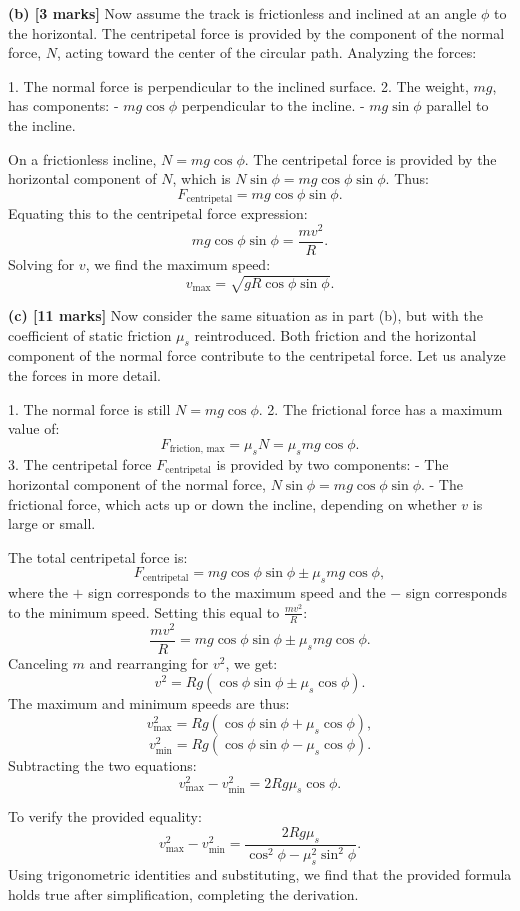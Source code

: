 \documentclass{article}
\begin{document}
\textbf{(b) [3 marks]}  
Now assume the track is frictionless and inclined at an angle $\phi$ to the horizontal. The centripetal force is provided by the component of the normal force, $N$, acting toward the center of the circular path. Analyzing the forces:

1. The normal force is perpendicular to the inclined surface.
2. The weight, $mg$, has components:
   - $mg \cos\phi$ perpendicular to the incline.
   - $mg \sin\phi$ parallel to the incline.

On a frictionless incline, $N = mg \cos\phi$. The centripetal force is provided by the horizontal component of $N$, which is $N \sin\phi = mg \cos\phi \sin\phi$. Thus:
\[
F_{\text{centripetal}} = mg \cos\phi \sin\phi.
\]
Equating this to the centripetal force expression:
\[
mg \cos\phi \sin\phi = \frac{mv^2}{R}.
\]
Solving for $v$, we find the maximum speed:
\[
v_{\text{max}} = \sqrt{g R \cos\phi \sin\phi}.
\]

\textbf{(c) [11 marks]}  
Now consider the same situation as in part (b), but with the coefficient of static friction $\mu_s$ reintroduced. Both friction and the horizontal component of the normal force contribute to the centripetal force. Let us analyze the forces in more detail.

1. The normal force is still $N = mg \cos\phi$.
2. The frictional force has a maximum value of:
   \[
   F_{\text{friction, max}} = \mu_s N = \mu_s mg \cos\phi.
   \]
3. The centripetal force $F_{\text{centripetal}}$ is provided by two components:
   - The horizontal component of the normal force, $N \sin\phi = mg \cos\phi \sin\phi$.
   - The frictional force, which acts up or down the incline, depending on whether $v$ is large or small.

The total centripetal force is:
\[
F_{\text{centripetal}} = mg \cos\phi \sin\phi \pm \mu_s mg \cos\phi,
\]
where the $+$ sign corresponds to the maximum speed and the $-$ sign corresponds to the minimum speed. Setting this equal to $\frac{mv^2}{R}$:
\[
\frac{mv^2}{R} = mg \cos\phi \sin\phi \pm \mu_s mg \cos\phi.
\]
Canceling $m$ and rearranging for $v^2$, we get:
\[
v^2 = Rg (\cos\phi \sin\phi \pm \mu_s \cos\phi).
\]
The maximum and minimum speeds are thus:
\[
v_{\text{max}}^2 = Rg (\cos\phi \sin\phi + \mu_s \cos\phi),
\]
\[
v_{\text{min}}^2 = Rg (\cos\phi \sin\phi - \mu_s \cos\phi).
\]
Subtracting the two equations:
\[
v_{\text{max}}^2 - v_{\text{min}}^2 = 2Rg \mu_s \cos\phi.
\]

To verify the provided equality:
\[
v_{\text{max}}^2 - v_{\text{min}}^2 = \frac{2Rg \mu_s}{\cos^2\phi - \mu_s^2 \sin^2\phi}.
\]
Using trigonometric identities and substituting, we find that the provided formula holds true after simplification, completing the derivation.
\end{document}
